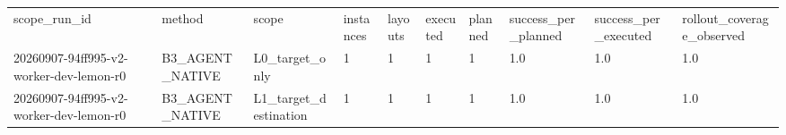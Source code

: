 \begin{tabular}{llllllllll}
scope\_run\_id & method & scope & instances & layouts & executed & planned & success\_per\_planned & success\_per\_executed & rollout\_coverage\_observed \\
20260907-94ff995-v2-worker-dev-lemon-r0 & B3\_AGENT\_NATIVE & L0\_target\_only & 1 & 1 & 1 & 1 & 1.0 & 1.0 & 1.0 \\
20260907-94ff995-v2-worker-dev-lemon-r0 & B3\_AGENT\_NATIVE & L1\_target\_destination & 1 & 1 & 1 & 1 & 1.0 & 1.0 & 1.0 \\
\end{tabular}
